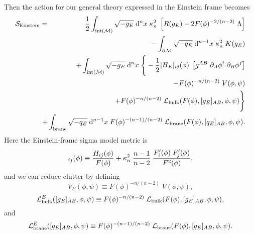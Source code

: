 \documentclass[a4paper,10pt]{article}
\begin{document}
Then the action for our general theory expressed in the Einstein frame
becomes
%
\begin{eqnarray}
\S_\Einstein=&&\hspace{-6mm}
{1 \over 2}\int_{{\rm int}(\M)} \sqrt{-g_E} \;\d^n x \; \kappa_n^{2} \; 
\left[ R(g_E) -2 F(\phi)^{-2/(n-2)} \; \Lambda \right] 
\nonumber\\
&&
-\int_{\partial\M} \sqrt{-q_E} \;\d^{n-1}x \;  \kappa_n^{2} \;K(g_E)
\nonumber\\  
&&\hspace{-6mm}
+\int_{{\rm int}(\M)} \sqrt{-g_E} \;\d^n x \;
\Bigg\{ -{1 \over 2} 
[H_E]_{ij}(\phi) \; 
\left[ g^{AB} \; \partial_{A}\phi^i \; \partial_{B}\phi^j \right] 
\nonumber
\\
&&
\qquad
- F(\phi)^{-n/(n-2)} \; V(\phi,\psi) 
\nonumber
\\
&&
\qquad
+ F(\phi)^{-n/(n-2)} \; \L_\bulk(F(\phi),[g_E]_{AB},\phi,\psi)
\Bigg\}
\nonumber \\  
&&\hspace{-6mm}
+\int_{\rm brane} \sqrt{-q_E} \;\d^{n-1}x\; 
F(\phi)^{-(n-1)/(n-2)}\;\L_\brane(F(\phi),[q_E]_{AB},\phi,\psi).
\label{E:action-in-einstein-frame}
\end{eqnarray}
%
Here the Einstein-frame sigma model metric is
%
\begin{equation}
[H_E]_{ij}(\phi)  \equiv
{H_{ij}(\phi) \over F(\phi) } + 
\kappa_n^2 \; {n-1\over n-2} \; {F'_i(\phi)  \; F'_j (\phi) \over F^2(\phi) },
\label{E:sigma-model-metric}
\end{equation}
%
and we can reduce clutter by defining
%
\begin{equation}
V_E(\phi,\psi) \equiv F(\phi)^{-n/(n-2)} \; V(\phi,\psi),
\end{equation}
%
%
\begin{equation}
{\mathcal L}_{\mathrm{bulk}}^E([g_E]_{AB},\phi,\psi) \equiv 
F(\phi)^{-n/(n-2)} \; {\mathcal L}_{\mathrm{bulk}}(F(\phi),[g_E]_{AB},\phi,\psi),
\end{equation}
%
and
%
\begin{equation}
{\mathcal L}_{\mathrm{brane}}^E([q_E]_{AB},\phi,\psi) \equiv
F(\phi)^{-(n-1)/(n-2)}\;{\mathcal L}_{\mathrm{brane}}(F(\phi),[q_E]_{AB},\phi,\psi).
\end{equation}
%
\end{document}
